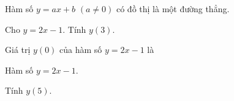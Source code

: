 \documentclass[12pt]{article}
\begin{document}

\begin{kienthuc}
Hàm số $y=ax+b$ $(a\ne0)$ có đồ thị là một đường thẳng.
\end{kienthuc}

\muctl
\begin{bt}
Cho $y=2x-1$. Tính $y(3)$.
\end{bt}
\muctn
\begin{tn}
Giá trị $y(0)$ của hàm số $y=2x-1$ là
\end{tn}
\mucds
\begin{ds}
Hàm số $y=2x-1$.
\end{ds}
\muctln
\begin{tln}
Tính $y(5)$.
\end{tln}
\bangdapan
\end{document}
